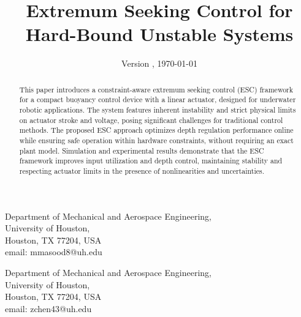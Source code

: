 ﻿\documentclass[subscriptcorrection,upint,varvw,barcolor=Goldenrod3,mathalfa=cal=euler,balance,hyphenate,french,pdf-a]{asmejour}
\begin{document}
{Department of Mechanical and Aerospace Engineering,\\
University of Houston,\\
Houston, TX 77204, USA\\
email: mmasood8@uh.edu}

{Department of Mechanical and Aerospace Engineering,\\
University of Houston,\\
Houston, TX 77204, USA\\
email: zchen43@uh.edu}

\title{Extremum Seeking Control for Hard-Bound Unstable Systems}


\begin{abstract}
This paper introduces a constraint-aware extremum seeking control (ESC) framework for a compact buoyancy control device with a linear actuator, designed for underwater robotic applications. The system features inherent instability and strict physical limits on actuator stroke and voltage, posing significant challenges for traditional control methods. The proposed ESC approach optimizes depth regulation performance online while ensuring safe operation within hardware constraints, without requiring an exact plant model. Simulation and experimental results demonstrate that the ESC framework improves input utilization and depth control, maintaining stability and respecting actuator limits in the presence of nonlinearities and uncertainties.
\end{abstract}

\date{Version \versionno, \today}

\maketitle
\end{document}
